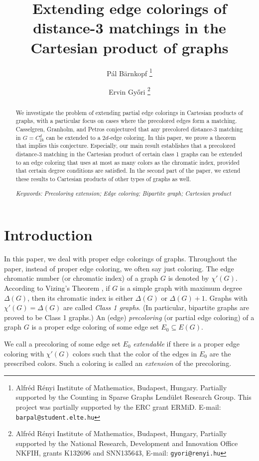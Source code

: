 \documentclass[a4paper,12pt]{article}
\title{Extending edge colorings of distance-3 matchings in the Cartesian product of graphs}
\date{}
\author{Pál Bärnkopf \thanks{Alfréd Rényi Institute of Mathematics, Budapest, Hungary. Partially supported by the Counting in Sparse Graphs Lendület Research Group. This project was partially supported by the ERC grant ERMiD.
E-mail: {\tt barpal@student.elte.hu}} %
\and 
Ervin Győri \thanks{Alfréd Rényi Institute of Mathematics, Budapest, Hungary, Partially supported by the National Research, Development and Innovation Office NKFIH, grants K132696 and SNN135643, 	E-mail: {\tt gyori@renyi.hu}}
}
\begin{document}
\maketitle

\begin{abstract}
We investigate the problem of extending partial edge colorings in Cartesian products of graphs, with a particular focus on cases where the precolored edges form a matching. Casselgren, Granholm, and Petros conjectured that any precolored distance-3 matching in $G = C^d_{2k}$ can be extended to a $2d$-edge coloring. In this paper, we prove a theorem that implies this conjecture. Especially, our main result establishes that a precolored distance-3 matching in the Cartesian product of certain class 1 graphs can be extended to an edge coloring that uses at most as many colors as the chromatic index, provided that certain degree conditions are satisfied. In the second part of the paper, we extend these results to Cartesian products of other types of graphs as well.





\textit{Keywords: Precoloring extension; Edge coloring; Bipartite graph; Cartesian product} 
\end{abstract}





\section{Introduction}

In this paper, we deal with proper edge colorings of graphs. Throughout the paper, instead of proper edge coloring, we often say just coloring. The edge chromatic number (or chromatic index) of a graph $G$ is denoted by $\chi'(G)$. According to Vizing's Theorem \cite{Vizing}, if $G$ is a simple graph with maximum degree $\Delta(G)$, then its chromatic index is either $\Delta(G)$ or $\Delta(G)+1$. Graphs with $\chi'(G)=\Delta(G)$ are called \textit{Class 1 graphs}. (In particular, bipartite graphs are proved to be Class 1 graphs.) An (edge) \textit{precoloring} (or partial edge coloring) of a graph $G$ is a proper edge coloring of some edge set $E_0 \subseteq E(G)$. 

We call a precoloring of some edge set $E_0$ \textit{extendable} if there is a proper edge coloring with $\chi'(G)$ colors such that the color of the edges in $E_0$ are the prescribed colors. Such a coloring is called an \textit{extension} of the precoloring.
\end{document}
